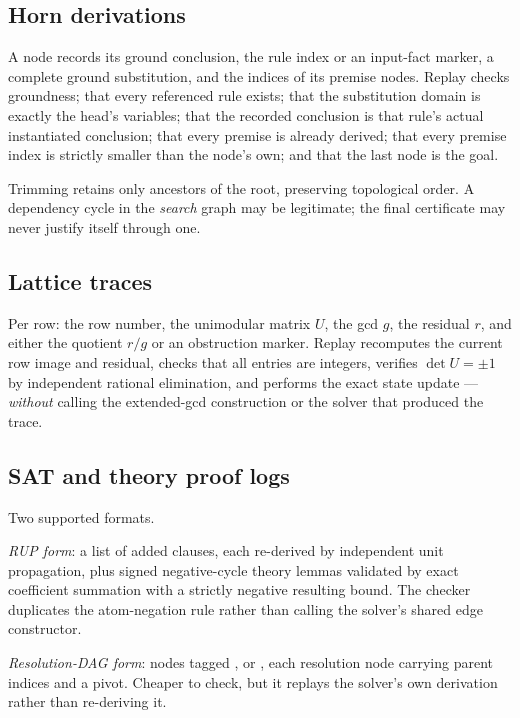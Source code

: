 \subsection{Horn derivations}

A node records its ground conclusion, the rule index or an input-fact marker, a
complete ground substitution, and the indices of its premise nodes. Replay
checks groundness; that every referenced rule exists; that the substitution
domain is exactly the head's variables; that the recorded conclusion is that
rule's actual instantiated conclusion; that every premise is already derived;
that every premise index is strictly smaller than the node's own; and that the
last node is the goal.

Trimming retains only ancestors of the root, preserving topological order. A
dependency cycle in the \emph{search} graph may be legitimate; the final
certificate may never justify itself through one.

\subsection{Lattice traces}

Per row: the row number, the unimodular matrix $U$, the gcd $g$, the residual
$r$, and either the quotient $r/g$ or an obstruction marker. Replay recomputes
the current row image and residual, checks that all entries are integers,
verifies $\det U=\pm1$ by independent rational elimination, and performs the
exact state update --- \emph{without} calling the extended-gcd construction or
the solver that produced the trace.

\subsection{SAT and theory proof logs}

Two supported formats.

\emph{RUP form}: a list of added clauses, each re-derived by independent unit
propagation, plus signed negative-cycle theory lemmas validated by exact
coefficient summation with a strictly negative resulting bound. The checker
duplicates the atom-negation rule rather than calling the solver's shared edge
constructor.

\emph{Resolution-DAG form}: nodes tagged ,  or
, each resolution node carrying parent indices and a pivot.
Cheaper to check, but it replays the solver's own derivation rather than
re-deriving it.

